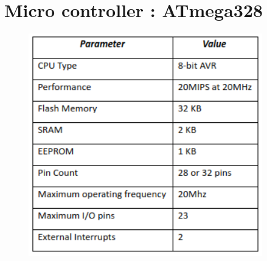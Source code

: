 \section{Micro controller : ATmega328}
\begin{figure}[!ht]
    \centering
    \vspace{5mm}
 \includegraphics[width=4in]{Chapters/images/ardtab.png}
    \caption{}
    \label{fig:my_label}
\end{figure}

